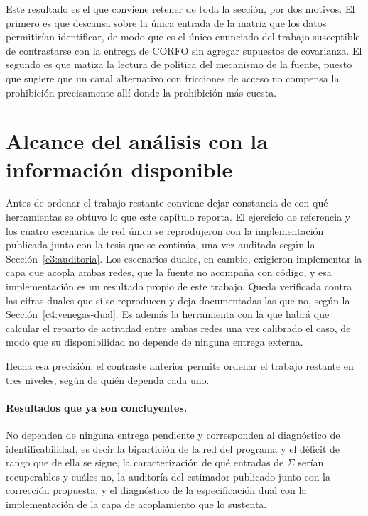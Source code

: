 Este resultado es el que conviene retener de toda la sección, por dos motivos. El primero es que descansa sobre la única entrada de la matriz que los datos permitirían identificar, de modo que es el único enunciado del trabajo susceptible de contrastarse con la entrega de CORFO sin agregar supuestos de covarianza. El segundo es que matiza la lectura de política del mecanismo de la fuente, puesto que sugiere que un canal alternativo con fricciones de acceso no compensa la prohibición precisamente allí donde la prohibición más cuesta.

\section{Alcance del análisis con la información disponible}
\label{c4:alcance}

Antes de ordenar el trabajo restante conviene dejar constancia de con qué herramientas se obtuvo lo que este capítulo reporta. El ejercicio de referencia y los cuatro escenarios de red única se reprodujeron con la implementación publicada junto con la tesis que se continúa, una vez auditada según la Sección~\ref{c3:auditoria}. Los escenarios duales, en cambio, exigieron implementar la capa que acopla ambas redes, que la fuente no acompaña con código, y esa implementación es un resultado propio de este trabajo. Queda verificada contra las cifras duales que sí se reproducen y deja documentadas las que no, según la Sección~\ref{c4:venegas-dual}. Es además la herramienta con la que habrá que calcular el reparto de actividad entre ambas redes una vez calibrado el caso, de modo que su disponibilidad no depende de ninguna entrega externa.

Hecha esa precisión, el contraste anterior permite ordenar el trabajo restante en tres niveles, según de quién dependa cada uno.

\paragraph{Resultados que ya son concluyentes.} No dependen de ninguna entrega pendiente y corresponden al diagnóstico de identificabilidad, es decir la bipartición de la red del programa y el déficit de rango que de ella se sigue, la caracterización de qué entradas de $\Sigma$ serían recuperables y cuáles no, la auditoría del estimador publicado junto con la corrección propuesta, y el diagnóstico de la especificación dual con la implementación de la capa de acoplamiento que lo sustenta.

